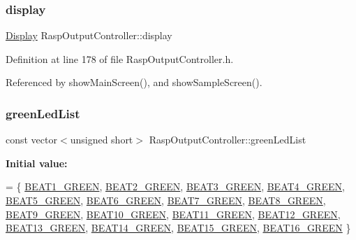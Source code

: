 \mbox{\label{class_rasp_output_controller_a0bb52cfee18c44cd2ed64dea27d5ccc4}} 
\subsubsection{\texorpdfstring{display}{display}}
{\footnotesize\ttfamily \hyperlink{class_display}{Display} Rasp\+Output\+Controller\+::display\hspace{0.3cm}{\ttfamily [private]}}



Definition at line 178 of file Rasp\+Output\+Controller.\+h.



Referenced by show\+Main\+Screen(), and show\+Sample\+Screen().

\mbox{\label{class_rasp_output_controller_a8b888abfd8719eb95568abaf53d68d5c}} 
\subsubsection{\texorpdfstring{green\+Led\+List}{greenLedList}}
{\footnotesize\ttfamily const vector$<$unsigned short$>$ Rasp\+Output\+Controller\+::green\+Led\+List\hspace{0.3cm}{\ttfamily [private]}}

{\bfseries Initial value\+:}
\begin{DoxyCode}
= \{
            \hyperlink{namespaceoutputs_ad934b2db0cff1421ca84b300dc257508}{BEAT1\_GREEN}, \hyperlink{namespaceoutputs_ad2dc5e7bf8fd1c9ffa64cf8efdb0035a}{BEAT2\_GREEN}, \hyperlink{namespaceoutputs_a95e392d21973d605abcc9efc19dce314}{BEAT3\_GREEN}, 
      \hyperlink{namespaceoutputs_afd9270436632213bade739dbc4f6c8f6}{BEAT4\_GREEN}, \hyperlink{namespaceoutputs_a4b1e0d3ad2b80752a68cdec9a73f5ac6}{BEAT5\_GREEN}, \hyperlink{namespaceoutputs_a55c3bd8cf6cdffbd199abc9ae5a0e1ac}{BEAT6\_GREEN}, 
      \hyperlink{namespaceoutputs_a971ea0c6742c83be5634cbf533cfb050}{BEAT7\_GREEN}, \hyperlink{namespaceoutputs_a6fe56e04e6ce7835262e2a60df0506d6}{BEAT8\_GREEN},
            \hyperlink{namespaceoutputs_a0600b91e575643cfee3eb9e9e5b14839}{BEAT9\_GREEN}, \hyperlink{namespaceoutputs_ab0b662f329ea65f6f5fc1acba70fbd07}{BEAT10\_GREEN}, \hyperlink{namespaceoutputs_a38945c3c9766ee86e3c97a79e2be45c1}{BEAT11\_GREEN}, 
      \hyperlink{namespaceoutputs_a863de14249bb5dd32b6fb2dd665f804e}{BEAT12\_GREEN}, \hyperlink{namespaceoutputs_a3410f51b9ac465ad73e71e8bd54b3ab4}{BEAT13\_GREEN}, \hyperlink{namespaceoutputs_a181a1c13a2964de30df1c57bae8f8428}{BEAT14\_GREEN}, 
      \hyperlink{namespaceoutputs_afacd3fd74ab006d3ce548b672c3ab2f7}{BEAT15\_GREEN},
            \hyperlink{namespaceoutputs_abb8efcc194a9934c26026a359edc8929}{BEAT16\_GREEN}
    \}
\end{DoxyCode}


